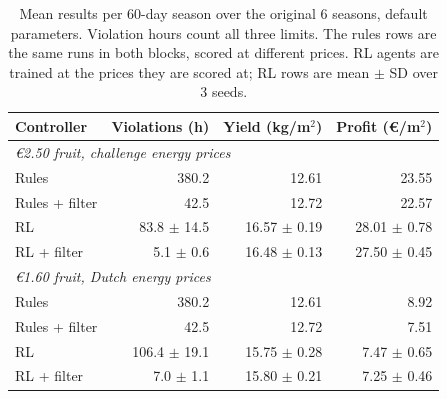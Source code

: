 \begin{table}[t]
\centering\small
\begin{tabular}{lrrr}
\toprule
Controller & Violations (h) & Yield (kg/m$^2$) & Profit (\euro/m$^2$) \\
\midrule
\multicolumn{4}{l}{\textit{\euro2.50 fruit, challenge energy prices}} \\
\quad Rules & 380.2 & 12.61 & 23.55 \\
\quad Rules + filter & 42.5 & 12.72 & 22.57 \\
\quad RL & 83.8 $\pm$ 14.5 & 16.57 $\pm$ 0.19 & 28.01 $\pm$ 0.78 \\
\quad RL + filter & 5.1 $\pm$ 0.6 & 16.48 $\pm$ 0.13 & 27.50 $\pm$ 0.45 \\
\midrule
\multicolumn{4}{l}{\textit{\euro1.60 fruit, Dutch energy prices}} \\
\quad Rules & 380.2 & 12.61 & 8.92 \\
\quad Rules + filter & 42.5 & 12.72 & 7.51 \\
\quad RL & 106.4 $\pm$ 19.1 & 15.75 $\pm$ 0.28 & 7.47 $\pm$ 0.65 \\
\quad RL + filter & 7.0 $\pm$ 1.1 & 15.80 $\pm$ 0.21 & 7.25 $\pm$ 0.46 \\
\bottomrule
\end{tabular}
\caption{Mean results per 60-day season over the original 6 seasons, default parameters. Violation hours count all three limits. The rules rows are the same runs in both blocks, scored at different prices. RL agents are trained at the prices they are scored at; RL rows are mean $\pm$ SD over 3 seeds.}
\label{tab:main}
\end{table}
